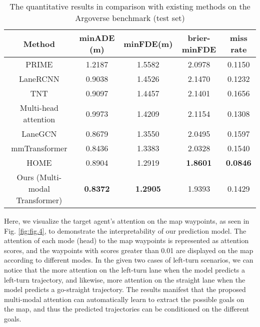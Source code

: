 \documentclass[letterpaper, 10 pt, conference]{ieeeconf}
\begin{document}
\begin{table*}[htp]
\centering
\caption{The quantitative results in comparison with existing methods on the Argoverse benchmark (test set)}
\begin{tabular}{ccccc}
\hline
Method                                      & minADE (m)      & minFDE(m)       & brier-minFDE  & miss rate       \\ \hline
PRIME \cite{song2021learning}               & 1.2187          & 1.5582          & 2.0978        & 0.1150         \\
LaneRCNN \cite{zeng2021lanercnn}            & 0.9038          & 1.4526          & 2.1470        & 0.1232      \\
TNT \cite{zhao2020tnt}                      & 0.9097          & 1.4457          & 2.1401        & 0.1656         \\
Multi-head attention \cite{mercat2020multi} & 0.9973          & 1.4209          & 2.1154        & 0.1308         \\
LaneGCN \cite{liang2020learning}            & 0.8679          & 1.3550          & 2.0495        & 0.1597                \\
mmTransformer \cite{liu2021multimodal}      & 0.8436          & 1.3383          & 2.0328        & 0.1540                 \\
HOME \cite{gilles2021home}                  & 0.8904          & 1.2919          &\textbf{1.8601}& \textbf{0.0846}   \\
Ours (Multi-modal Transformer)              & \textbf{0.8372} & \textbf{1.2905} & 1.9393        & 0.1429 \\ \hline
\end{tabular}\label{tab1}
\end{table*}

Here, we visualize the target agent's attention on the map waypoints, as seen in Fig. \ref{fig:fig.4}, to demonstrate the interpretability of our prediction model. The attention of each mode (head) to the map waypoints is represented as attention scores, and the waypoints with scores greater than 0.01 are displayed on the map according to different modes. In the given two cases of left-turn scenarios, we can notice that the more attention on the left-turn lane when the model predicts a left-turn trajectory, and likewise, more attention on the straight lane when the model predicts a go-straight trajectory. The results manifest that the proposed multi-modal attention can automatically learn to extract the possible goals on the map, and thus the predicted trajectories can be conditioned on the different goals. 
\end{document}

